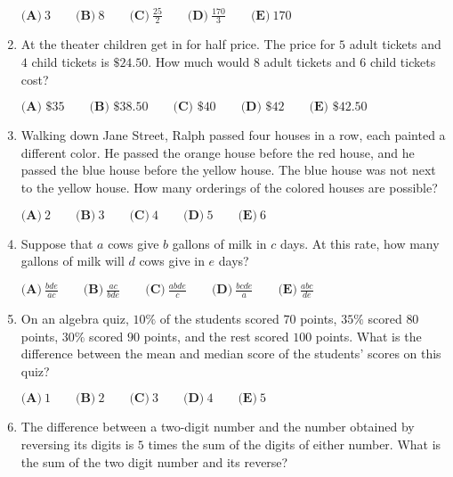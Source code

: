 \documentclass{article}
\begin{document}
\begin{enumerate}[label=\arabic*., itemsep=0.5em]
$ \textbf{(A)}\ 3\qquad\textbf{(B)}\ 8\qquad\textbf{(C)}\ \frac{25}{2}\qquad\textbf{(D)}\ \frac{170}{3}\qquad\textbf{(E)}\ 170$\par \vspace{0.5em}\item At the theater children get in for half price.  The price for $5$ adult tickets and $4$ child tickets is $\$24.50$.  How much would $8$ adult tickets and $6$ child tickets cost?

$\textbf{(A) }\$35\qquad
\textbf{(B) }\$38.50\qquad
\textbf{(C) }\$40\qquad
\textbf{(D) }\$42\qquad
\textbf{(E) }\$42.50$\par \vspace{0.5em}\item Walking down Jane Street, Ralph passed four houses in a row, each painted a different color. He passed the orange house before the red house, and he passed the blue house before the yellow house. The blue house was not next to the yellow house. How many orderings of the colored houses are possible?

$ \textbf{(A)}\ 2\qquad\textbf{(B)}\ 3\qquad\textbf{(C)}\ 4\qquad\textbf{(D)}\ 5\qquad\textbf{(E)}\ 6$\par \vspace{0.5em}\item Suppose that $a$ cows give $b$ gallons of milk in $c$ days. At this rate, how many gallons of milk will $d$ cows give in $e$ days?

$ \textbf{(A)}\ \frac{bde}{ac}\qquad\textbf{(B)}\ \frac{ac}{bde}\qquad\textbf{(C)}\ \frac{abde}{c}\qquad\textbf{(D)}\ \frac{bcde}{a}\qquad\textbf{(E)}\ \frac{abc}{de}$\par \vspace{0.5em}\item On an algebra quiz, $10\%$ of the students scored $70$ points, $35\%$ scored $80$ points, $30\%$ scored $90$ points, and the rest scored $100$ points. What is the difference between the mean and median score of the students' scores on this quiz?

$ \textbf{(A)}\ 1\qquad\textbf{(B)}\ 2\qquad\textbf{(C)}\ 3\qquad\textbf{(D)}\ 4\qquad\textbf{(E)}\ 5$\par \vspace{0.5em}\item The difference between a two-digit number and the number obtained by reversing its digits is $5$ times the sum of the digits of either number.  What is the sum of the two digit number and its reverse?


\end{enumerate}
\end{document}
